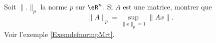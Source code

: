 \begin{exercice}\label{exoGeomAnal-0040}

    Soit \( \| . \|_p\) la norme $p$ sur \( \eR^n\). Si \( A\) est une matrice, montrer que
    \begin{equation}
        \| A \|_p=\sup_{\| x \|_p=1}\| Ax \|.
    \end{equation}
    Voir l'exemple \ref{ExemdefnormpMrt}.

\end{exercice}
